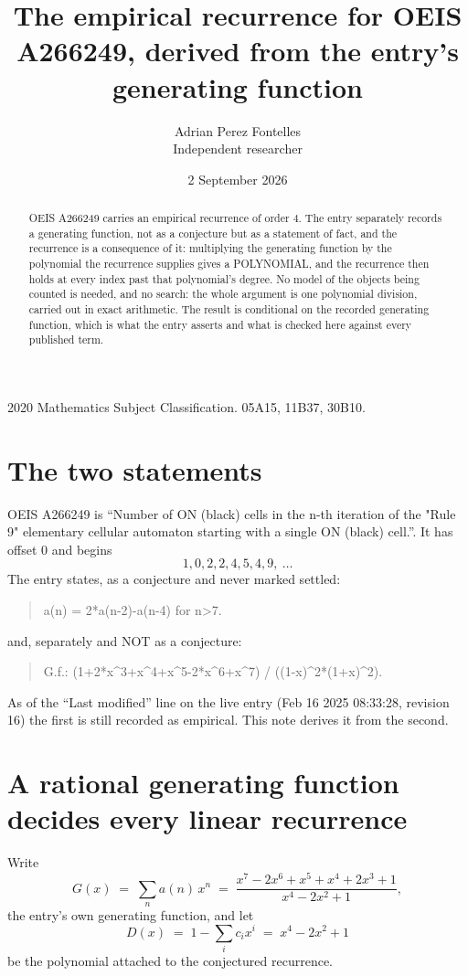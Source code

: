 \documentclass[11pt,a4paper]{article}
\title{The empirical recurrence for OEIS A266249, derived from the entry's generating function}
\author{Adrian Perez Fontelles\\ \small Independent researcher}
\date{2 September 2026}
\theoremstyle{plain}
\theoremstyle{definition}
\begin{document}
\maketitle

\begin{abstract}
OEIS A266249 carries an empirical recurrence of order $4$. The entry separately records a
generating function, not as a conjecture but as a statement of fact, and the recurrence is a
consequence of it: multiplying the generating function by the polynomial the recurrence
supplies gives a POLYNOMIAL, and the recurrence then holds at every index past that
polynomial's degree. No model of the objects being counted is needed, and no search: the
whole argument is one polynomial division, carried out in exact arithmetic. The result is
conditional on the recorded generating function, which is what the entry asserts and what is
checked here against every published term.
\end{abstract}

\noindent\small 2020 Mathematics Subject Classification. 05A15, 11B37, 30B10.\normalsize

\section{The two statements}

OEIS A266249 is ``Number of ON (black) cells in the n-th iteration of the "Rule 9" elementary cellular automaton starting with a single ON (black) cell.''. It has offset $0$ and begins
\[
1, 0, 2, 2, 4, 5, 4, 9,\ \dots
\]
The entry states, as a conjecture and never marked settled:
\begin{quote}
a(n) = 2*a(n-2)-a(n-4) for n>7.
\end{quote}
and, separately and NOT as a conjecture:
\begin{quote}
G.f.: (1+2*x\^{}3+x\^{}4+x\^{}5-2*x\^{}6+x\^{}7) / ((1-x)\^{}2*(1+x)\^{}2).
\end{quote}
As of the ``Last modified'' line on the live entry (Feb 16 2025 08:33:28, revision 16) the first is still
recorded as empirical. This note derives it from the second.

\section{A rational generating function decides every linear recurrence}

Write
\[
G(x)\;=\;\sum_{n}a(n)\,x^{n}\;=\;\frac{x^{7} - 2 x^{6} + x^{5} + x^{4} + 2 x^{3} + 1}{x^{4} - 2 x^{2} + 1},
\]
the entry's own generating function, and let
\[
D(x)\;=\;1-\sum_i c_i x^{i}\;=\;x^{4} - 2 x^{2} + 1
\]
be the polynomial attached to the conjectured recurrence.
\end{document}
